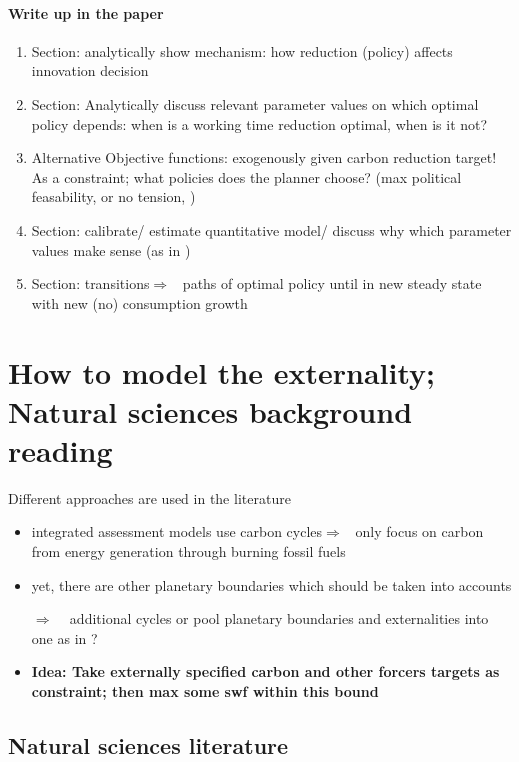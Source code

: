 \documentclass[12pt]{article}
\newcommand{\ar}{$\Rightarrow$ \ }
\begin{document}
\paragraph{Write up in the paper}
\begin{enumerate}
\item Section: analytically show mechanism: how reduction (policy) affects innovation decision
\item Section: Analytically discuss relevant parameter values on which optimal policy depends: when is a working time reduction optimal, when is it not?
\item Alternative Objective functions: exogenously given carbon reduction target! As a constraint; what policies does the planner choose? (max political feasability, or no tension, )
\item Section: calibrate/ estimate quantitative model/ discuss why which parameter values make sense (as in \cite{Jones2016LifeGrowth, Fried2018ClimateAnalysis})
\item Section: transitions\ar paths of optimal policy until in new steady state with new (no) consumption growth
\end{enumerate} 

\section{How to model the externality; Natural sciences background reading}
Different approaches are used in the literature
\begin{itemize}
\item integrated assessment models use carbon cycles\ar only focus on carbon from energy generation through burning fossil fuels
\item yet, there are other planetary boundaries \citep{Rockstrom2009AHumanity} which should be taken into accounts
\item[\ar] additional cycles or pool planetary boundaries and externalities into one as in \cite{Dasgupta2021}?
\item \textbf{Idea: Take externally specified carbon and other forcers targets as constraint; then max some swf within this bound}
\end{itemize}

\subsection{Natural sciences literature}
\end{document}
